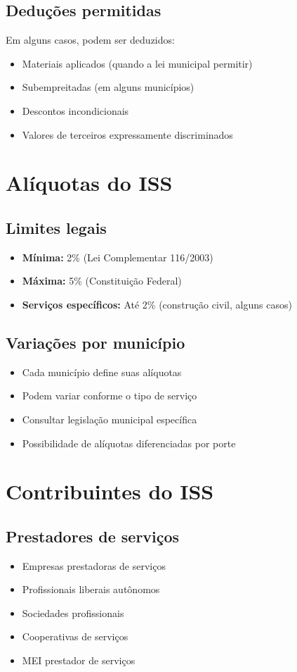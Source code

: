 \documentclass[12pt,a4paper]{article}
\begin{document}
\subsection{Deduções permitidas}
Em alguns casos, podem ser deduzidos:
\begin{itemize}
    \item Materiais aplicados (quando a lei municipal permitir)
    \item Subempreitadas (em alguns municípios)
    \item Descontos incondicionais
    \item Valores de terceiros expressamente discriminados
\end{itemize}

\section{Alíquotas do ISS}

\subsection{Limites legais}
\begin{itemize}
    \item \textbf{Mínima:} 2\% (Lei Complementar 116/2003)
    \item \textbf{Máxima:} 5\% (Constituição Federal)
    \item \textbf{Serviços específicos:} Até 2\% (construção civil, alguns casos)
\end{itemize}

\subsection{Variações por município}
\begin{itemize}
    \item Cada município define suas alíquotas
    \item Podem variar conforme o tipo de serviço
    \item Consultar legislação municipal específica
    \item Possibilidade de alíquotas diferenciadas por porte
\end{itemize}

\section{Contribuintes do ISS}

\subsection{Prestadores de serviços}
\begin{itemize}
    \item Empresas prestadoras de serviços
    \item Profissionais liberais autônomos
    \item Sociedades profissionais
    \item Cooperativas de serviços
    \item MEI prestador de serviços
\end{itemize}
\end{document}
